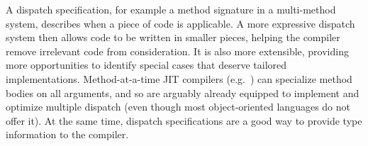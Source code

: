 A dispatch specification, for example a method signature in a
multi-method system, describes when a piece of code is applicable.
A more expressive dispatch system then allows code to be written
in smaller pieces, helping the compiler remove irrelevant code
from consideration.
It is also more extensible, providing more opportunities to
identify special cases that deserve tailored implementations.
Method-at-a-time JIT compilers
(e.g.\ \cite{grcevski2004java, Suganuma:2005:DED:1075382.1075386})
can specialize method bodies on all arguments, and so are
arguably already equipped to implement and optimize multiple dispatch
(even though most object-oriented languages do not offer it).
At the same time, dispatch specifications are a good way to provide
type information to the compiler.






